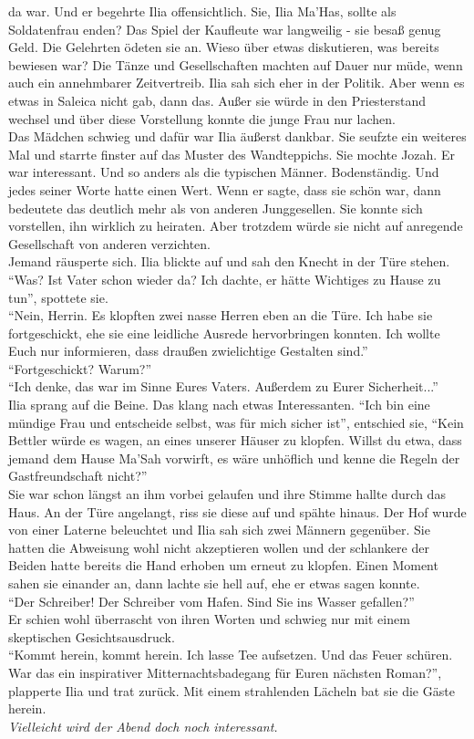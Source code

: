 da war. Und er begehrte Ilia offensichtlich. Sie, Ilia Ma'Has, sollte als Soldatenfrau enden? Das 
Spiel der Kaufleute war langweilig - sie besaß genug Geld. Die Gelehrten ödeten sie an. Wieso 
über etwas diskutieren, was bereits bewiesen war? Die Tänze und Gesellschaften machten auf Dauer 
nur müde, wenn auch ein annehmbarer Zeitvertreib. Ilia sah sich eher in der Politik. Aber wenn es 
etwas in Saleica nicht gab, dann das. Außer sie würde in den Priesterstand wechsel und über diese 
Vorstellung konnte die junge Frau nur lachen.\\
Das Mädchen schwieg und dafür war Ilia äußerst dankbar. Sie seufzte ein weiteres Mal und starrte 
finster auf das Muster des Wandteppichs. Sie mochte Jozah. Er war interessant. Und so anders als die 
typischen Männer. Bodenständig. Und jedes seiner Worte hatte einen Wert. Wenn er sagte, dass sie 
schön war, dann bedeutete das deutlich mehr als von anderen Junggesellen. Sie konnte sich 
vorstellen, ihn wirklich zu heiraten. Aber trotzdem würde sie nicht auf anregende Gesellschaft von 
anderen verzichten. \\
Jemand räusperte sich. Ilia blickte auf und sah den Knecht in der Türe stehen.\\
``Was? Ist Vater schon wieder da? Ich dachte, er hätte Wichtiges zu Hause zu tun'', spottete sie. \\
``Nein, Herrin. Es klopften zwei nasse Herren eben an die Türe. Ich habe sie fortgeschickt, ehe sie 
eine leidliche Ausrede hervorbringen konnten. Ich wollte Euch nur informieren, dass draußen 
zwielichtige Gestalten sind.''\\
``Fortgeschickt? Warum?'' \\
``Ich denke, das war im Sinne Eures Vaters. Außerdem zu Eurer Sicherheit...'' \\
Ilia sprang auf die Beine. Das klang nach etwas Interessanten. ``Ich bin eine mündige Frau und 
entscheide selbst, was für mich sicher 
ist'', entschied sie, ``Kein Bettler würde es wagen, an eines unserer Häuser zu klopfen. Willst du 
etwa, dass jemand dem Hause Ma'Sah vorwirft, es wäre unhöflich und kenne die Regeln der 
Gastfreundschaft nicht?'' \\
Sie war schon längst an ihm vorbei gelaufen und ihre Stimme hallte durch das Haus. An der Türe 
angelangt, riss sie diese auf und spähte hinaus. Der Hof wurde von einer Laterne beleuchtet und Ilia 
sah sich zwei Männern gegenüber. Sie hatten die Abweisung wohl nicht akzeptieren wollen und der 
schlankere der Beiden hatte bereits die Hand erhoben um erneut zu klopfen. Einen Moment sahen sie 
 einander an, dann lachte sie hell auf, ehe er etwas sagen konnte. \\
``Der Schreiber! Der Schreiber vom Hafen. Sind Sie ins Wasser gefallen?'' \\
Er schien wohl überrascht von ihren Worten und schwieg nur mit einem skeptischen Gesichtsausdruck. 
\\
``Kommt herein, kommt herein. Ich lasse Tee aufsetzen. Und das Feuer schüren. War das ein 
inspirativer Mitternachtsbadegang für Euren nächsten Roman?'', plapperte Ilia und trat zurück. Mit 
einem strahlenden Lächeln bat sie die Gäste herein. \\
\textit{Vielleicht wird der Abend doch noch interessant.}\\